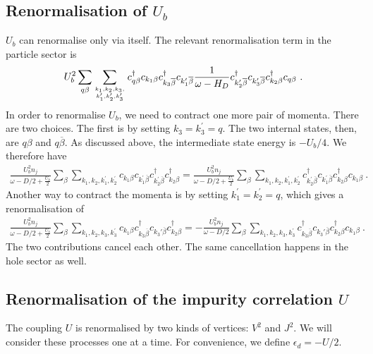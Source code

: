 \documentclass{iopart}
\begin{document}
\subsection{Renormalisation of \(U_b\)}
\(U_b\) can renormalise only via itself. The relevant renormalisation term in the particle sector is
\begin{eqnarray}
	U_b^2 \sum_{q\beta}\sum_{k_1,k_2,k_3,\atop{k_1^\prime,k_2^\prime,k_3^\prime}} c^\dagger_{q\beta}c_{k_1\beta}c^\dagger_{k_3\overline\beta}c_{k_1^\prime\overline\beta}\frac{1}{\omega - H_D}c^\dagger_{k_2^\prime\overline\beta}c_{k_3^\prime\overline\beta}c^\dagger_{k_2\beta}c_{q\beta}~.
\end{eqnarray}
In order to renormalise \(U_b\), we need to contract one more pair of momenta. There are two choices. The first is by setting \(k_3 = k_3^\prime = q\). The two internal states, then, are \(q\beta\) and \(q\overline\beta\). As discussed above, the intermediate state energy is \(-U_b/4\). We therefore have
\begin{eqnarray}
	\frac{U_b^2 n_j}{\omega - D/2 + \frac{U_b}{2}}\sum_{\beta}\sum_{k_1,k_2,k_1^\prime,k_2^\prime} c_{k_1\beta}c_{k_1^\prime\overline\beta}c^\dagger_{k_2^\prime\overline\beta}c^\dagger_{k_2\beta} = \frac{U_b^2 n_j}{\omega - D/2 + \frac{U_b}{2}}\sum_{\beta}\sum_{k_1,k_2,k_1^\prime,k_2^\prime} c^\dagger_{k_2^\prime\overline\beta}c_{k_1^\prime\overline\beta}c^\dagger_{k_2\beta}c_{k_1\beta}~.
\end{eqnarray}
Another way to contract the momenta is by setting \(k_1^\prime = k_2^\prime = q\), which gives a renormalisation of
\begin{eqnarray}
	\frac{U_b^2 n_j}{\omega - D/2 + \frac{U_b}{2}}\sum_{\beta}\sum_{k_1,k_2,k_3,k_3^\prime} c_{k_1\beta}c^\dagger_{k_3 \overline\beta}c_{k_3\prime\overline\beta}c^\dagger_{k_2\beta} = -\frac{U_b^2 n_j}{\omega - D/2}\sum_{\beta}\sum_{k_1,k_2,k_3,k_3^\prime} c^\dagger_{k_3 \overline\beta}c_{k_3\prime\overline\beta}c^\dagger_{k_2\beta}c_{k_1\beta}~.
\end{eqnarray}
The two contributions cancel each other. The same cancellation happens in the hole sector as well.

\subsection{Renormalisation of the impurity correlation \(U\)}
The coupling \(U\) is renormalised by two kinds of vertices: \(V^2\) and \(J^2\). We will consider these processes one at a time. For convenience, we define \(\epsilon_d = -U/2\).
\end{document}

